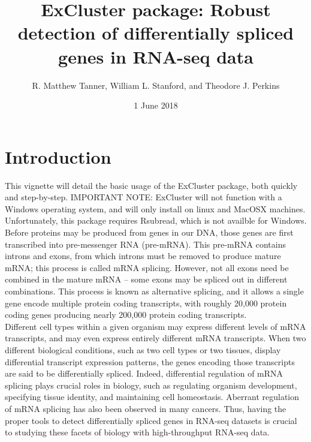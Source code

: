 \documentclass[12pt]{article}
\begin{document}


\title{ExCluster package: Robust detection of differentially spliced genes in RNA-seq data}
\author{R. Matthew Tanner, William L. Stanford, and Theodore J. Perkins}
\date{1 June 2018}
\maketitle

\section{Introduction}
This vignette will detail the basic usage of the ExCluster package, both quickly and step-by-step. IMPORTANT NOTE: ExCluster will not function with a Windows operating system, and will only install on linux and MacOSX machines. Unfortunately, this package requires Rsubread, which is not availble for Windows.\\

Before proteins may be produced from genes in our DNA, those genes are first transcribed into pre-messenger RNA (pre-mRNA). This pre-mRNA contains introns and exons, from which introns must be removed to produce mature mRNA; this process is called mRNA splicing. However, not all exons need be combined in the mature mRNA -- some exons may be spliced out in different combinations. This process is known as alternative splicing, and it allows a single gene encode multiple protein coding transcripts, with roughly 20,000 protein coding genes producing nearly 200,000 protein coding transcripts.\\

Different cell types within a given organism may express different levels of mRNA transcripts, and may even express entirely different mRNA transcripts. When two different biological conditions, such as two cell types or two tissues, display differential transcript expression patterns, the genes encoding those transcripts are said to be differentially spliced. Indeed, differential regulation of mRNA splicing plays crucial roles in biology, such as regulating organism development, specifying tissue identity, and maintaining cell homeostasis. Aberrant regulation of mRNA splicing has also been observed in many cancers. Thus, having the proper tools to detect differentially spliced genes in RNA-seq datasets is crucial to studying these facets of biology with high-throughput RNA-seq data.\\
\end{document}
